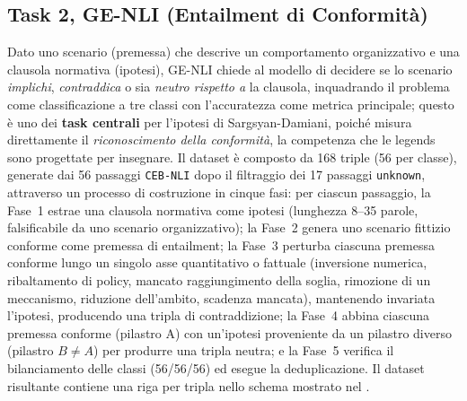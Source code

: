\documentclass[pdflatex, sn-apa]{sn-jnl}%
\theoremstyle{thmstyleone}%
\theoremstyle{thmstyletwo}%
\theoremstyle{thmstylethree}%
\begin{document}
\subsection{Task 2, GE-NLI (Entailment di Conformità)}
\label{sec:bench:nli}
Dato uno scenario (premessa) che descrive un comportamento organizzativo e una
clausola normativa (ipotesi), GE-NLI chiede al modello di decidere se lo scenario
\emph{implichi}, \emph{contraddica} o sia \emph{neutro rispetto a} la clausola,
inquadrando il problema come classificazione a tre classi con l'accuratezza come
metrica principale; questo è uno dei \textbf{task centrali} per l'ipotesi di
Sargsyan-Damiani, poiché misura direttamente il \emph{riconoscimento della
conformità}, la competenza che le legends sono progettate per insegnare. Il
dataset è composto da 168 triple (56 per classe), generate dai 56 passaggi
\texttt{CEB-NLI} dopo il filtraggio dei 17 passaggi \texttt{unknown}, attraverso
un processo di costruzione in cinque fasi: per ciascun passaggio, la Fase~1
estrae una clausola normativa come ipotesi (lunghezza 8--35 parole, falsificabile
da uno scenario organizzativo); la Fase~2 genera uno scenario fittizio conforme
come premessa di entailment; la Fase~3 perturba ciascuna premessa conforme lungo
un singolo asse quantitativo o fattuale (inversione numerica, ribaltamento di
policy, mancato raggiungimento della soglia, rimozione di un meccanismo, riduzione
dell'ambito, scadenza mancata), mantenendo invariata l'ipotesi, producendo una
tripla di contraddizione; la Fase~4 abbina ciascuna premessa conforme (pilastro
A) con un'ipotesi proveniente da un pilastro diverso (pilastro $B\neq A$) per
produrre una tripla neutra; e la Fase~5 verifica il bilanciamento delle classi
(56/56/56) ed esegue la deduplicazione. Il dataset risultante contiene una riga
per tripla nello schema mostrato nel .



\end{document}
